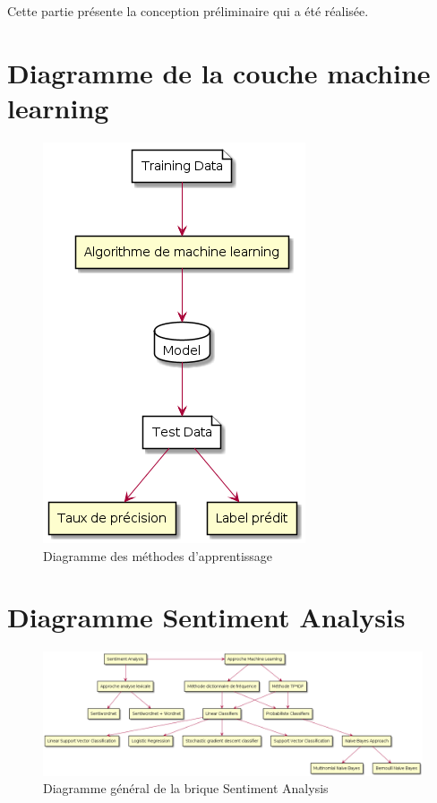 \par Cette partie présente la conception préliminaire qui a été réalisée.





\section {Diagramme de la couche machine learning}
\begin{figure}[h!]
	\centerline{\includegraphics[scale=0.8]{img/diagramme_machine_learning.png}}
	\caption{Diagramme des méthodes d'apprentissage}
\end{figure}


\section {Diagramme Sentiment Analysis}

\begin{figure}[h!]
	\centerline{\includegraphics[scale=0.4]{img/diagramme_sentiment_analysis.png}}
	\caption{Diagramme général de la brique Sentiment Analysis}
\end{figure}


